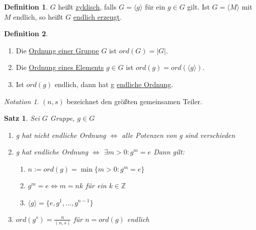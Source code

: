 \documentclass[12pt]{scrartcl}%
\newtheorem{thm}{Satz}
\theoremstyle{definition}
\newtheorem*{defn}{Definition}
\theoremstyle{remark}
\newtheorem*{notation}{Notation}
\begin{document}
\begin{defn}
	$G$ heißt \underline{zyklisch}, falls $G = \langle g \rangle$ für ein $g \in G$ gilt. \newline
	Ist $G = \langle M \rangle$ mit $M$ endlich, so heißt $G$ \underline{endlich erzeugt}.
\end{defn}

\begin{defn}
	\begin{enumerate}[label=(\roman*)]
		\item Die \underline{Ordnung einer Gruppe} $G$ ist $ord(G)=\vert G \vert$.
		\item Die \underline{Ordnung eines Elements} $g \in G$ ist $ord(g)=ord(\langle g \rangle)$.
		\item Ist $ord(g)$ endlich, dann hat g \underline{endliche Ordnung}.
	\end{enumerate}
\end{defn}

\begin{notation}
    $(n,s)$ bezeichnet den größten gemeinsamen Teiler.
\end{notation}

\begin{thm}
	Sei $G$ Gruppe, $g \in G$
	\begin{enumerate}
		\item g hat nicht endliche Ordnung $\Longleftrightarrow$ alle Potenzen von g sind verschieden
		\item g hat endliche Ordnung $\Longleftrightarrow$ $\exists m>0: g^{m}=e$ \newline Dann gilt:
			\begin{enumerate}[label=(\alph*)]
				\item $n := ord(g) = \min \lbrace m>0 : g^{m}=e \rbrace$
				\item $g^{m}=e \Longleftrightarrow m=nk$ für ein $k \in \mathbb{Z}$
				\item $\langle g \rangle = \lbrace e, g^{1},...,g^{n-1}\rbrace$
			\end{enumerate}
		\item $ord(g^{s}) = \frac{n}{(n,s)}$ für $n = ord(g)$ endlich
	\end{enumerate}
\end{thm}
\end{document}
